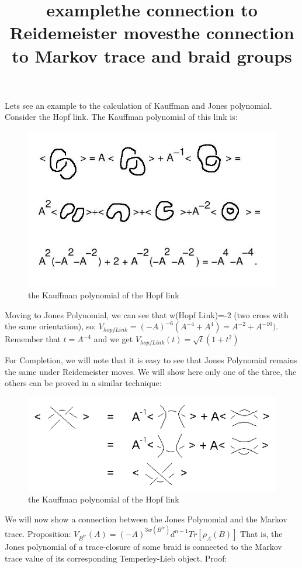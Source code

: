 \documentclass{article}
\begin{document}
\title{example}
Lets see an example to the calculation of Kauffman and Jones polynomial. Consider the Hopf link.
The Kauffman polynomial of this link is:
\begin{figure}
\includegraphics[scale=0.15]{hopf_link} 
\caption{the Kauffman polynomial of the Hopf link}
\end{figure}

Moving to Jones Polynomial, we can see that w(Hopf Link)=-2 (two cross with the same orientation), so:
$V_{hopfLink}=(-A)^{-6}(A^{-4}+A^{4}) = A^{-2} + A^{-10})$.
Remember that $t = A^{-4}$ and we get $V_{hopfLink}(t)=\sqrt{t}(1+t^{2})$  



\title{the connection to Reidemeister moves}
For Completion, we will note that it is easy to see that Jones Polynomial remains the same
under Reidemeister moves. We will show here only one of the three, the others can be proved in a similar technique:
\begin{figure}
\includegraphics[scale=1]{jones_and_reidimister.jpg} 
\caption{the Kauffman polynomial of the Hopf link}
\end{figure}  


\title{the connection to Markov trace and braid groups}
We will now show a connection between the Jones Polynomial and the Markov trace.
Proposition:
$V_{B^{tr}}(A) = (-A)^{3w(B^{tr})}d^{n-1}Tr[\rho_{A}(B)]$
That is, the Jones polynomial of a trace-closure of some braid is connected to the Markov trace value of its corresponding Temperley-Lieb object.
Proof:
\end{document}
